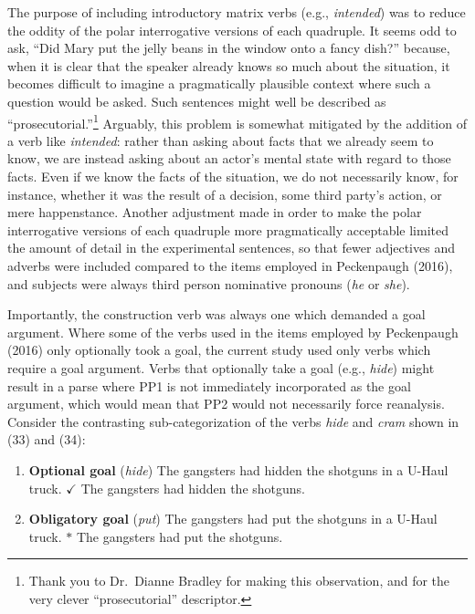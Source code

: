 \documentclass[11pt,oneside]{book}
\let\rmarkdownfootnote\footnote%
\def\footnote{\protect\rmarkdownfootnote}
\begin{document}
The purpose of including introductory matrix verbs (e.g., \emph{intended}) was to reduce the oddity of the polar interrogative versions of each quadruple. It seems odd to ask, ``Did Mary put the jelly beans in the window onto a fancy dish?'' because, when it is clear that the speaker already knows so much about the situation, it becomes difficult to imagine a pragmatically plausible context where such a question would be asked. Such sentences might well be described as ``prosecutorial.''\footnote{Thank you to Dr.~Dianne Bradley for making this observation, and for the very clever ``prosecutorial'' descriptor.} Arguably, this problem is somewhat mitigated by the addition of a verb like \emph{intended}: rather than asking about facts that we already seem to know, we are instead asking about an actor's mental state with regard to those facts. Even if we know the facts of the situation, we do not necessarily know, for instance, whether it was the result of a decision, some third party's action, or mere happenstance. Another adjustment made in order to make the polar interrogative versions of each quadruple more pragmatically acceptable limited the amount of detail in the experimental sentences, so that fewer adjectives and adverbs were included compared to the items employed in Peckenpaugh (2016), and subjects were always third person nominative pronouns (\emph{he} or \emph{she}).

Importantly, the construction verb was always one which demanded a goal argument. Where some of the verbs used in the items employed by Peckenpaugh (2016) only optionally took a goal, the current study used only verbs which require a goal argument. Verbs that optionally take a goal (e.g., \emph{hide}) might result in a parse where PP1 is not immediately incorporated as the goal argument, which would mean that PP2 would not necessarily force reanalysis. Consider the contrasting sub-categorization of the verbs \emph{hide} and \emph{cram} shown in (33) and (34):

\begin{enumerate}
\def\labelenumi{(\arabic{enumi})}
\setcounter{enumi}{32}
\item
  \textbf{Optional goal} (\emph{hide}) \linebreak\nopagebreak
  The gangsters had hidden the shotguns in a U-Haul truck. \linebreak\nopagebreak
  \(\checkmark\) The gangsters had hidden the shotguns.
\item
  \textbf{Obligatory goal} (\emph{put}) \linebreak\nopagebreak
  The gangsters had put the shotguns in a U-Haul truck. \linebreak\nopagebreak
  \(*\) The gangsters had put the shotguns.
\end{enumerate}
\end{document}
